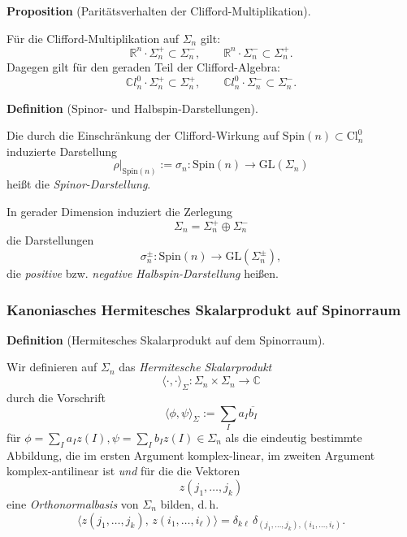 \documentclass[10pt, letterpaper]{article}
\newcommand{\R}{\mathbb{R}}
\newcommand{\C}{\mathbb{C}}
\newcommand{\Cl}{\mathrm{Cl}}
\newcommand{\GL}{\mathrm{GL}}
\newcommand{\Spin}{\mathrm{Spin}}
\newcommand{\CustomHeading}[3]{%
  \par\medskip\noindent%
  \textbf{#1 #2} \textnormal{(#3)}.\enskip%
}
\newenvironment{DEF}[2]{\CustomHeading{Definition}{#1}{#2}}{}
\newenvironment{PROP}[2]{\CustomHeading{Proposition}{#1}{#2}}{}
\begin{document}
\begin{PROP}{}{Paritätsverhalten der Clifford-Multiplikation}
Für die Clifford-Multiplikation auf $\Sigma_n$ gilt:
\[
\R^n\cdot \Sigma_n^+ \subset \Sigma_n^-,
\qquad
\R^n\cdot \Sigma_n^- \subset \Sigma_n^+.
\]
Dagegen gilt für den geraden Teil der Clifford-Algebra:
\[
\C l_n^0\cdot \Sigma_n^+ \subset \Sigma_n^+,
\qquad
\C l_n^0\cdot \Sigma_n^- \subset \Sigma_n^-.
\]
\end{PROP}

\begin{DEF}{}{Spinor- und Halbspin-Darstellungen}
Die durch die Einschränkung der Clifford-Wirkung auf $\Spin(n)\subset \Cl_n^0$
induzierte Darstellung
\[
\rho|_{\Spin(n)}:=\sigma_n:\Spin(n)\to \GL(\Sigma_n)
\]
heißt die \emph{Spinor-Darstellung}.

In gerader Dimension induziert die Zerlegung
\[
\Sigma_n=\Sigma_n^+\oplus \Sigma_n^-
\]
die Darstellungen
\[
\sigma_n^\pm:\Spin(n)\to \GL(\Sigma_n^\pm),
\]
die \emph{positive} bzw. \emph{negative Halbspin-Darstellung} heißen.
\end{DEF}



\pagebreak

\subsubsection{Kanoniasches Hermitesches Skalarprodukt auf Spinorraum}



\begin{DEF}{}{Hermitesches Skalarprodukt auf dem Spinorraum}
Wir definieren auf $\Sigma_n$ das \emph{Hermitesche Skalarprodukt}
\[
\langle\cdot,\cdot\rangle_\Sigma:\Sigma_n\times \Sigma_n\to \C
\]
durch die Vorschrift 
$$\langle\phi, \psi\rangle_\Sigma:=\sum_I a_I \overline{b_I}$$
für $\phi=\sum_I a_I z(I), \psi=\sum_I b_I z(I)\in \Sigma_n$ als die eindeutig bestimmte Abbildung, die im ersten Argument komplex-linear, im zweiten Argument komplex-antilinear ist \emph{und} für die die Vektoren
\[
z(j_1,\dots,j_k)
\]
eine \emph{Orthonormalbasis} von $\Sigma_n$ bilden, d.\,h.
\[
\bigl\langle z(j_1,\dots,j_k),\, z(i_1,\dots,i_\ell)\bigr\rangle
=
\delta_{k\ell}\,\delta_{(j_1,\dots,j_k),(i_1,\dots,i_\ell)}.
\]
\end{DEF}
\end{document}
